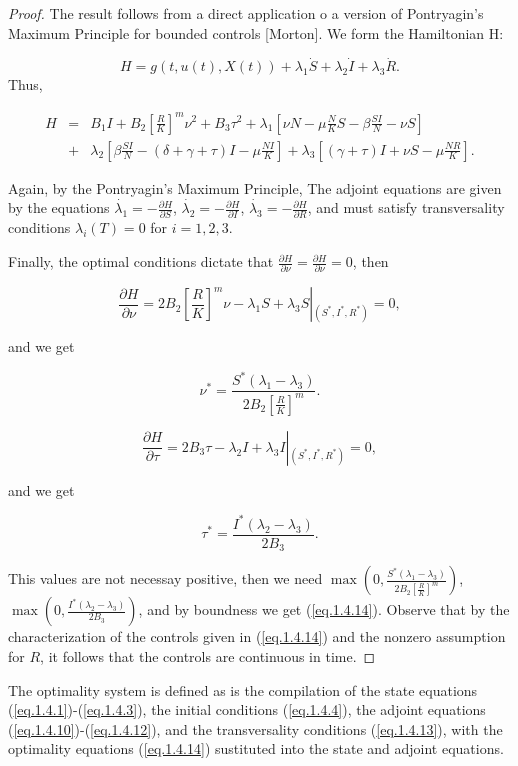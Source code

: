\begin{proof}
The result follows from a direct application o a version of Pontryagin's 
Maximum Principle for bounded controls [Morton]. We form the Hamiltonian H:

$$H=g(t,u(t),X(t))+\lambda_1\dot{S}+\lambda_2\dot{I}+\lambda_3\dot{R}.$$
Thus,

\begin{eqnarray}\label{eq.1.4.15}
H&=&B_1I+B_2 [\frac{R}{K}]^m\nu^2+B_3\tau^2+\lambda_1[\nu 
N-\mu\frac{N}{K}S-\beta\frac{SI}{N}-\nu S]\nonumber\\
&+&\lambda_2[\beta 
\frac{SI}{N}-(\delta+\gamma+\tau)I-\mu\frac{NI}{K}]+\lambda_3[(\gamma+\tau)I+\nu
 S-\mu\frac{NR}{K}].
\end{eqnarray}

Again, by the Pontryagin's Maximum Principle, The adjoint equations are given 
by the equations $\dot{\lambda_1}=-\frac{\partial H}{\partial S}$, 
$\dot{\lambda_2}=-\frac{\partial H}{\partial I}$, 
$\dot{\lambda_3}=-\frac{\partial H}{\partial R}$, and must satisfy 
transversality conditions $\lambda_i(T)=0$ for $i=1,2,3$. 

Finally, the optimal conditions dictate that $\frac{\partial H}{\partial 
\nu}=\frac{\partial H}{\partial \nu}=0$, then

$$\frac{\partial H}{\partial \nu}=2B_2\left[\frac{R}{K}\right]^m\nu-\lambda_1 
S+\lambda_3 S\left|_{(S^*,I^*,R^*)}\right.=0,$$

and we get 

$$\nu^*=\frac{S^*(\lambda_1-\lambda_3)}{2B_2\left[\frac{R}{K}\right]^m}.$$

$$\frac{\partial H}{\partial \tau}=2B_3\tau-\lambda_2 I+\lambda_3 
I\left|_{(S^*,I^*,R^*)}\right.=0,$$

and we get 

$$\tau^*=\frac{I^*(\lambda_2 -\lambda_3)}{2B_3}.$$

This values are not necessay positive, then we need $\max\left 
(0,\frac{S^*(\lambda_1-\lambda_3)}{2B_2\left[\frac{R}{K}\right]^m}\right )$, 
$\max\left ( 0,\frac{I^*(\lambda_2 -\lambda_3)}{2B_3}\right )$, and by 
boundness we get (\ref{eq.1.4.14}). Observe that by the characterization of the 
controls given in (\ref{eq.1.4.14}) and the nonzero assumption for $R$, it 
follows that the controls are continuous in time.	
\end{proof}

The optimality system is defined as is the compilation of the state equations 
(\ref{eq.1.4.1})-(\ref{eq.1.4.3}), the initial conditions (\ref{eq.1.4.4}), the 
adjoint equations (\ref{eq.1.4.10})-(\ref{eq.1.4.12}), and the transversality 
conditions (\ref{eq.1.4.13}), with the optimality equations (\ref{eq.1.4.14}) 
sustituted into the state and adjoint equations.

